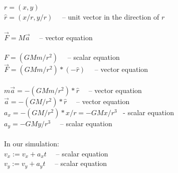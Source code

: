 \documentclass[aspectratio=169,xcolor=pdftex,dvipsnames]{beamer} %
\begin{document}

\begin{frame}
\frametitle{}


$r = (x,y)$\\
$\hat{r} = (x/r, y/r)$  \ \ -- unit vector in the direction of $r$\\
\ \\
$\vec{F} = M\vec{a}$                          \ \ -- vector equation\\
\ \\
$F = (GMm / r^2)$                    \ \ -- scalar equation\\
$\vec{F} = (GMm / r^2) * (- \hat{r})$      \ \   -- vector equation\\
\ \\
$m\vec{a} = - (GMm / r^2) * \hat{r}$        \ \  -- vector equation\\
$\vec{a}  = - (GM  / r^2) * \hat{r}$       \ \   -- vector equation\\
$a_x = - (GM  / r^2) * x/r = -GMx/r^3$ \ \-- scalar equation\\
$a_y =                       -GMy/r^3$ \ \ -- scalar equation\\
\ \\
In our simulation:\\
$v_x := v_x + a_x t$        \ \            -- scalar equation\\
$v_y := v_y + a_y t$        \ \             -- scalar equation

\end{frame}

\end{document}
